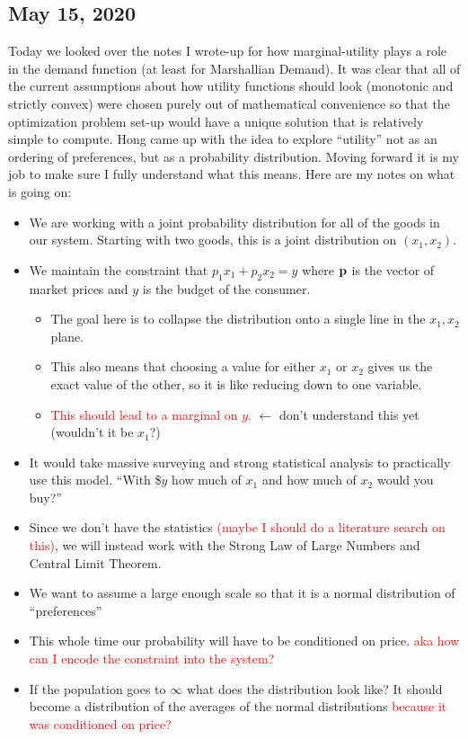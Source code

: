 \subsection{May 15, 2020}
Today we looked over the notes I wrote-up for how marginal-utility plays a role in the demand function (at least for Marshallian Demand). It was clear that all of the current assumptions about how utility functions should look (monotonic and strictly convex) were chosen purely out of mathematical convenience so that the optimization problem set-up would have a unique solution that is relatively simple to compute. Hong came up with the idea to explore ``utility'' not as an ordering of preferences, but as a probability distribution. Moving forward it is my job to make sure I fully understand what this means. Here are my notes on what is going on:
\begin{itemize}
	\item We are working with a joint probability distribution for all of the goods in our system. Starting with two goods, this is a joint distribution on $(x_1, x_2).$
	\item We maintain the constraint that $p_1x_1 + p_2x_2 = y$ where $\mathbf{p}$ is the vector of market prices and $y$ is the budget of the consumer. 
	\begin{itemize}
		\item The goal here is to collapse the distribution onto a single line in the $x_1, x_2$ plane.
		\item This also means that choosing a value for either $x_1$ or $x_2$ gives us the exact value of the other, so it is like reducing down to one variable.
		\item \textcolor{red}{This should lead to a marginal on $y$.} $\leftarrow$ don't understand this yet (wouldn't it be $x_1$?) 
	\end{itemize}
	\item It would take massive surveying and strong statistical analysis to practically use this model. ``With \$$y$ how much of $x_1$ and how much of $x_2$ would you buy?''
	\item Since we don't have the statistics \textcolor{red}{(maybe I should do a literature search on this)}, we will instead work with the Strong Law of Large Numbers and Central Limit Theorem. 
	\item We want to assume a large enough scale so that it is a normal distribution of ``preferences''
	\item This whole time our probability will have to be conditioned on price. \textcolor{red}{aka how can I encode the constraint into the system?}
	\item If the population goes to $\infty$ what does the distribution look like? It should become a distribution of the averages of the normal distributions \textcolor{red}{because it was conditioned on price?}
\end{itemize}


